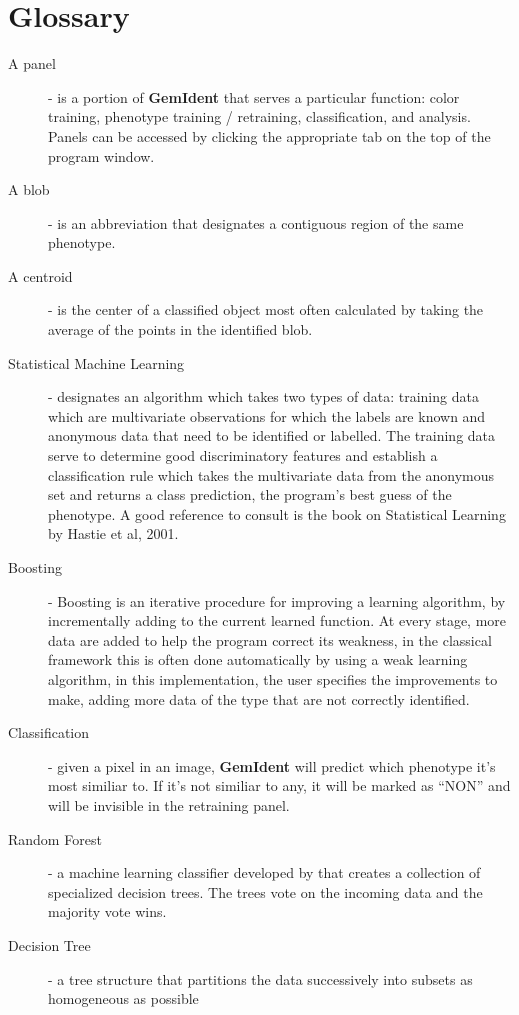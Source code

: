 \documentclass[12pt]{article}
\begin{document}
\section{Glossary}
\begin{description}
\item[A panel] - is a portion of {\bf GemIdent} that serves a particular function: color training, phenotype training / retraining, classification, and analysis. Panels can be accessed by clicking the appropriate tab on the top of the program window.
\item[A blob] - is an abbreviation that designates a contiguous region of the same phenotype.
\item[A centroid] - is the center of a classified object most often calculated by taking the average of the points in the identified blob.
\item[Statistical Machine Learning] - designates an algorithm which takes two types of data: training data which are multivariate observations for which the labels are known and anonymous data that need to be identified or labelled. The training data serve to determine good discriminatory features and establish a classification rule which takes the multivariate data from the anonymous set and returns a class prediction, the program's best guess of the phenotype. A good reference to consult is the book on Statistical Learning by Hastie et al, 2001\cite{hastie}.
\item[Boosting] - Boosting is an iterative procedure for improving a learning algorithm, 
by incrementally adding to the current learned function. 
At every stage, more data are added to help the program correct its weakness, in the classical framework
this is often done automatically by using a weak learning algorithm, in this implementation,
the user specifies the improvements to make, adding more data of the type that
are not correctly identified.
\item[Classification] - given a pixel in an image, {\bf GemIdent} will predict which phenotype it's most similiar to. If it's not similiar to any, it will be marked as ``NON'' and will be invisible in the retraining panel.
\item[Random Forest] - a machine learning classifier developed by \cite{breiman} 
that creates a collection of specialized decision trees. The trees vote on the incoming data and the majority vote wins.
\item[Decision Tree] - a tree structure that partitions the data successively
 into subsets as homogeneous as possible

\end{description}
\end{document}
